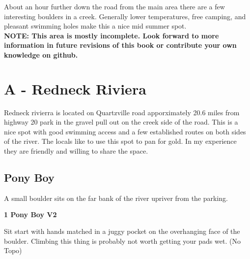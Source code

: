 

\raggedcolumns
\begin{multicols}{2}
\end{multicols}
\begin{multicols}{2}
About an hour further down the road from the main area there are a few interesting boulders in a creek. Generally lower temperatures, free camping, and pleasant swimming holes make this a nice mid summer spot.\\

\textbf{NOTE: This area is mostly incomplete. Look forward to more information in future revisions of this book or contribute your own knowledge on github.}\\
\newpage

		\section{A - Redneck Riviera}\label{sa:Redneck Riviera}
	Redneck rivierra is located on Quartzville road apporximately 20.6 miles from highway 20 park in the gravel pull out on the creek side of the road. This is a nice spot with good swimming access and a few established routes on both sides of the river. The locals like to use this spot to pan for gold. In my experience they are friendly and willing to share the space.\\

	
		\subsection*{Pony Boy}\label{bf:Pony Boy}
		A small boulder sits on the far bank of the river upriver from the parking.\\
	
			\label{rt:Pony Boy}
\colorbox{green!20}{
\parbox{0.95\linewidth}{
\textbf{
1 Pony Boy V2  
}
}
}

			\begin{adjustwidth}{0.5cm}{}				
			Sit start with hands matched in a juggy pocket on the overhanging face of the boulder. Climbing this thing is probably not worth getting your pads wet.
				\newline (No Topo) 
			\end{adjustwidth}

\end{multicols}
